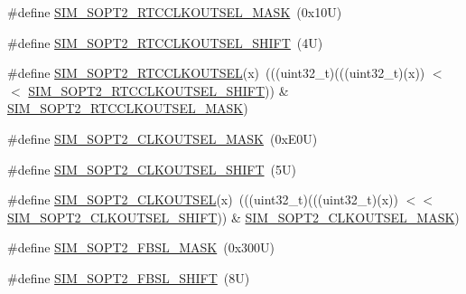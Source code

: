 \begin{DoxyCompactItemize}
\item 
\#define \mbox{\hyperlink{group___s_i_m___register___masks_ga4ecc21f62a92e94e5f507a6bb5e44062}{S\+I\+M\+\_\+\+S\+O\+P\+T2\+\_\+\+R\+T\+C\+C\+L\+K\+O\+U\+T\+S\+E\+L\+\_\+\+M\+A\+SK}}~(0x10\+U)
\item 
\#define \mbox{\hyperlink{group___s_i_m___register___masks_gaa4b7f7e8f1999ec0d56a1224cf7eb35d}{S\+I\+M\+\_\+\+S\+O\+P\+T2\+\_\+\+R\+T\+C\+C\+L\+K\+O\+U\+T\+S\+E\+L\+\_\+\+S\+H\+I\+FT}}~(4\+U)
\item 
\#define \mbox{\hyperlink{group___s_i_m___register___masks_gad826a2d088a5cae1628582c992b0349e}{S\+I\+M\+\_\+\+S\+O\+P\+T2\+\_\+\+R\+T\+C\+C\+L\+K\+O\+U\+T\+S\+EL}}(x)~(((uint32\+\_\+t)(((uint32\+\_\+t)(x)) $<$$<$ \mbox{\hyperlink{group___s_i_m___register___masks_gaa4b7f7e8f1999ec0d56a1224cf7eb35d}{S\+I\+M\+\_\+\+S\+O\+P\+T2\+\_\+\+R\+T\+C\+C\+L\+K\+O\+U\+T\+S\+E\+L\+\_\+\+S\+H\+I\+FT}})) \& \mbox{\hyperlink{group___s_i_m___register___masks_ga4ecc21f62a92e94e5f507a6bb5e44062}{S\+I\+M\+\_\+\+S\+O\+P\+T2\+\_\+\+R\+T\+C\+C\+L\+K\+O\+U\+T\+S\+E\+L\+\_\+\+M\+A\+SK}})
\item 
\#define \mbox{\hyperlink{group___s_i_m___register___masks_ga601bb7007f58e3ad5433d3538f4dcef0}{S\+I\+M\+\_\+\+S\+O\+P\+T2\+\_\+\+C\+L\+K\+O\+U\+T\+S\+E\+L\+\_\+\+M\+A\+SK}}~(0x\+E0\+U)
\item 
\#define \mbox{\hyperlink{group___s_i_m___register___masks_ga520c9a255ff79372237f5f332f749112}{S\+I\+M\+\_\+\+S\+O\+P\+T2\+\_\+\+C\+L\+K\+O\+U\+T\+S\+E\+L\+\_\+\+S\+H\+I\+FT}}~(5\+U)
\item 
\#define \mbox{\hyperlink{group___s_i_m___register___masks_ga34712f0ffce6dca092bd902ef7eb783f}{S\+I\+M\+\_\+\+S\+O\+P\+T2\+\_\+\+C\+L\+K\+O\+U\+T\+S\+EL}}(x)~(((uint32\+\_\+t)(((uint32\+\_\+t)(x)) $<$$<$ \mbox{\hyperlink{group___s_i_m___register___masks_ga520c9a255ff79372237f5f332f749112}{S\+I\+M\+\_\+\+S\+O\+P\+T2\+\_\+\+C\+L\+K\+O\+U\+T\+S\+E\+L\+\_\+\+S\+H\+I\+FT}})) \& \mbox{\hyperlink{group___s_i_m___register___masks_ga601bb7007f58e3ad5433d3538f4dcef0}{S\+I\+M\+\_\+\+S\+O\+P\+T2\+\_\+\+C\+L\+K\+O\+U\+T\+S\+E\+L\+\_\+\+M\+A\+SK}})
\item 
\#define \mbox{\hyperlink{group___s_i_m___register___masks_ga27b0cb220aaf94e8d04795bd682ebd78}{S\+I\+M\+\_\+\+S\+O\+P\+T2\+\_\+\+F\+B\+S\+L\+\_\+\+M\+A\+SK}}~(0x300\+U)
\item 
\#define \mbox{\hyperlink{group___s_i_m___register___masks_ga7077057e2a7f0841d8151d2703d85f16}{S\+I\+M\+\_\+\+S\+O\+P\+T2\+\_\+\+F\+B\+S\+L\+\_\+\+S\+H\+I\+FT}}~(8\+U)

\end{DoxyCompactItemize}
